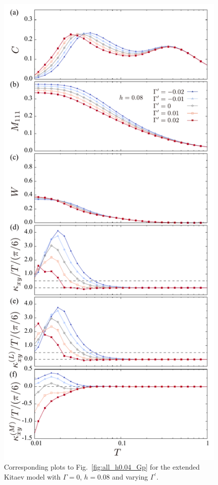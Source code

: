 \documentclass[twocolumn,superscriptaddress,showpacs, longbibliography, aps, prb]{revtex4-2}
\begin{document}
\begin{figure}
  \begin{center}
    \includegraphics[width=0.9\linewidth]{Figs/plot_all_h0.08_Gp.pdf}
  \end{center}
  \caption{
     Corresponding plots to Fig.~\ref{fig:all_h0.04_Gp} for the extended Kitaev model with $\Gamma=0$, $h=0.08$ and varying $\Gamma^{\prime}$.
}
\end{figure}
\end{document}
